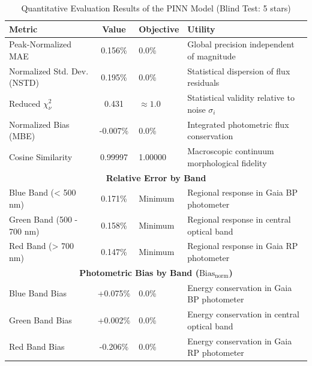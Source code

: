 
\begin{table}[htpb]
\centering
\caption{Quantitative Evaluation Results of the PINN Model (Blind Test: 5 stars)}
\label{tab:pinn_evaluation}
\begin{tabular}{lcll}
\hline
\textbf{Metric} & \textbf{Value} & \textbf{Objective} & \textbf{Utility} \\
\hline
Peak-Normalized MAE & 0.156\% & 0.0\% & Global precision independent of magnitude \\
Normalized Std. Dev. (NSTD) & 0.195\% & 0.0\% & Statistical dispersion of flux residuals \\
Reduced $\chi^2_\nu$ & 0.431 & $\approx 1.0$ & Statistical validity relative to noise $\sigma_i$ \\
Normalized Bias (MBE) & -0.007\% & 0.0\% & Integrated photometric flux conservation \\
Cosine Similarity & 0.99997 & 1.00000 & Macroscopic continuum morphological fidelity \\
\hline
\multicolumn{4}{c}{\textbf{Relative Error by Band}} \\
\hline
Blue Band (< 500 nm) & 0.171\% & Minimum & Regional response in Gaia BP photometer \\
Green Band (500 - 700 nm) & 0.158\% & Minimum & Regional response in central optical band \\
Red Band (> 700 nm) & 0.147\% & Minimum & Regional response in Gaia RP photometer \\
\hline
\multicolumn{4}{c}{\textbf{Photometric Bias by Band ($\text{Bias}_{\text{norm}}$)}} \\
\hline
Blue Band Bias & +0.075\% & 0.0\% & Energy conservation in Gaia BP photometer \\
Green Band Bias & +0.002\% & 0.0\% & Energy conservation in central optical band \\
Red Band Bias & -0.206\% & 0.0\% & Energy conservation in Gaia RP photometer \\
\hline
\end{tabular}
\end{table}
